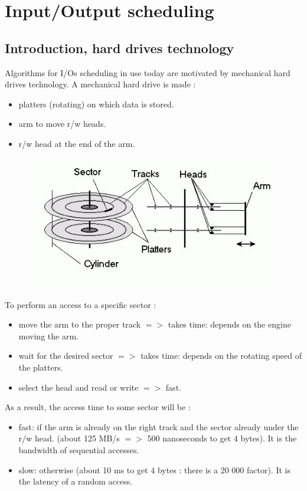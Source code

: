 \chapter{Input/Output scheduling}
\section{Introduction, hard drives technology}

Algorithms for I/Os scheduling in use today are motivated by mechanical hard drives technology.
A mechanical hard drive is made :
\begin{itemize}
  \item platters (rotating) on which data is stored.
  \item arm to move r/w heads.
  \item r/w head at the end of the arm.
\end{itemize}

\begin{figure}[h!]
  \begin{center}
    \includegraphics{hard_drive_picture.jpg}
  \end{center}
\end{figure}

To perform an access to a specific sector :
\begin{itemize}
  \item move the arm to the proper track
  $=>$ takes time: depends on the engine moving the arm.
  \item wait for the desired sector
   $=>$ takes time: depends on the rotating speed of the platters.
  \item select the head and read or write
  $=>$ fast.
\end{itemize}

As a result, the access time to some sector will be :
\begin{itemize}
  \item fast: if the arm is already on the right track and the sector already under the r/w head. (about 125 MB/s $=>$ 500 nanoseconds to get 4 bytes).
  It is the bandwidth of sequential accesses.
  \item slow: otherwise (about 10 ms to get 4 bytes : there is a 20 000 factor).
  It is the latency of a random access.
  
\end{itemize}

